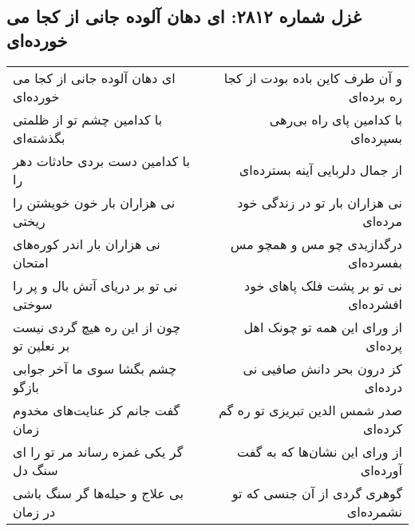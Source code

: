 \begin{center}
\section*{غزل شماره ۲۸۱۲: ای دهان آلوده جانی از کجا می خورده‌ای}
\label{sec:2812}
\begin{longtable}{l p{0.5cm} r}
ای دهان آلوده جانی از کجا می خورده‌ای
&&
و آن طرف کاین باده بودت از کجا ره برده‌ای
\\
با کدامین چشم تو از ظلمتی بگذشته‌ای
&&
با کدامین پای راه بی‌رهی بسپرده‌ای
\\
با کدامین دست بردی حادثات دهر را
&&
از جمال دلربایی آینه بسترده‌ای
\\
نی هزاران بار خون خویشتن را ریختی
&&
نی هزاران بار تو در زندگی خود مرده‌ای
\\
نی هزاران بار اندر کوره‌های امتحان
&&
درگدازیدی چو مس و همچو مس بفسرده‌ای
\\
نی تو بر دریای آتش بال و پر را سوختی
&&
نی تو بر پشت فلک پاهای خود افشرده‌ای
\\
چون از این ره هیچ گردی نیست بر نعلین تو
&&
از ورای این همه تو چونک اهل پرده‌ای
\\
چشم بگشا سوی ما آخر جوابی بازگو
&&
کز درون بحر دانش صافیی نی درده‌ای
\\
گفت جانم کز عنایت‌های مخدوم زمان
&&
صدر شمس الدین تبریزی تو ره گم کرده‌ای
\\
گر یکی غمزه رساند مر تو را ای سنگ دل
&&
از ورای این نشان‌ها که به گفت آورده‌ای
\\
بی علاج و حیله‌ها گر سنگ باشی در زمان
&&
گوهری گردی از آن جنسی که تو نشمرده‌ای
\\
\end{longtable}
\end{center}
